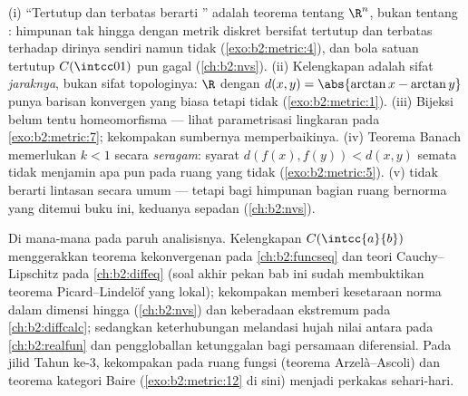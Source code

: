\begin{remark}\label{rem:b2:metric:pitfalls}
(i) ``Tertutup dan terbatas berarti '' adalah teorema tentang
$\R^n$, bukan tentang : himpunan tak hingga dengan
metrik diskret bersifat tertutup dan terbatas terhadap dirinya sendiri
namun tidak  (\cref{exo:b2:metric:4}), dan bola satuan tertutup
$C(\intcc01)$ pun gagal (\cref{ch:b2:nvs}). (ii) Kelengkapan adalah
sifat \emph{jaraknya}, bukan sifat topologinya: $\R$
dengan $d(x,y) = \abs{\arctan x - \arctan y}$ punya barisan konvergen
yang biasa tetapi tidak 
(\cref{exo:b2:metric:1}). (iii) Bijeksi  belum tentu
homeomorfisma --- lihat parametrisasi lingkaran pada
\cref{exo:b2:metric:7}; kekompakan sumbernya memperbaikinya.
(iv) Teorema Banach memerlukan $k < 1$ secara \emph{seragam}: syarat
$d(f(x), f(y)) < d(x,y)$ semata tidak menjamin apa pun pada ruang
yang tidak  (\cref{exo:b2:metric:5}). (v)  tidak
berarti  lintasan secara umum --- tetapi bagi himpunan
bagian  ruang bernorma yang ditemui buku ini, keduanya sepadan
(\cref{ch:b2:nvs}).
\end{remark}

\begin{remark}
Di mana-mana pada paruh analisisnya. Kelengkapan
$C(\intcc{a}{b})$ menggerakkan teorema kekonvergenan pada
\cref{ch:b2:funcseq} dan teori Cauchy--Lipschitz pada
\cref{ch:b2:diffeq} (soal akhir pekan bab ini sudah membuktikan
teorema Picard--Lindelöf yang lokal); kekompakan memberi
kesetaraan norma dalam dimensi hingga (\cref{ch:b2:nvs}) dan
keberadaan ekstremum pada \cref{ch:b2:diffcalc}; sedangkan keterhubungan
melandasi hujah nilai antara pada \cref{ch:b2:realfun}
dan penggloballan ketunggalan bagi persamaan diferensial. Pada
jilid Tahun ke-3, kekompakan pada ruang fungsi (teorema
Arzelà--Ascoli) dan teorema kategori Baire
(\cref{exo:b2:metric:12} di sini) menjadi perkakas sehari-hari.
\end{remark}

